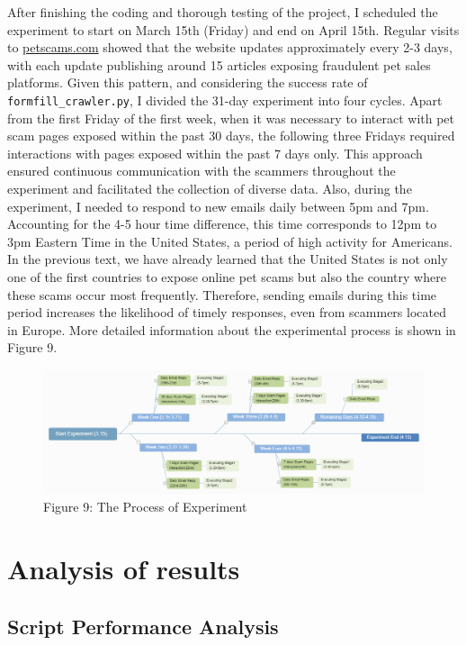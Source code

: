 \documentclass[ oneside,%
                    author={Cassie Qing Tang},
                    degree={BSc},
                     title={An Automated Response System for Disrupting Online Pet Scamming \\ },
                    subtitle={ }]{dissertation}
\begin{document}
After finishing the coding and thorough testing of the project, I scheduled the experiment to start on March 15th (Friday) and end on April 15th. Regular visits to \href{www.petscams.com}{petscams.com} showed that the website updates approximately every 2-3 days, with each update publishing around 15 articles exposing fraudulent pet sales platforms. Given this pattern, and considering the success rate of \texttt{formfill\_crawler.py}, I divided the 31-day experiment into four cycles. Apart from the first Friday of the first week, when it was necessary to interact with pet scam pages exposed within the past 30 days, the following three Fridays required interactions with pages exposed within the past 7 days only. This approach ensured continuous communication with the scammers throughout the experiment and facilitated the collection of diverse data. Also, during the experiment, I needed to respond to new emails daily between 5pm and 7pm. Accounting for the 4-5 hour time difference, this time corresponds to 12pm to 3pm Eastern Time in the United States, a period of high activity for Americans. In the previous text, we have already learned that the United States is not only one of the first countries to expose online pet scams but also the country where these scams occur most frequently. Therefore, sending emails during this time period increases the likelihood of timely responses, even from scammers located in Europe. More detailed information about the experimental process is shown in Figure 9.
\begin{figure}[H]\ContinuedFloat
\centering
\includegraphics[width=\linewidth]{pic/figure9.png}
\caption{Figure 9: The Process of Experiment}
\label{fig:pic9}
\end{figure}


\chapter{Analysis of results}
\section{Script Performance Analysis}
\end{document}
